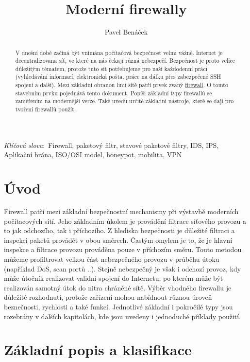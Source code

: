 \documentclass[11pt,a4paper]{article}
\title{Moderní firewally}
\author{Pavel Benáček}
\def\keywords{\vspace{.5em}
{\textit{Klíčová slova}:\,\relax%
}}
\begin{document}
\maketitle

\begin{abstract}
V dnešní době začíná být vnímána počítačová bezpečnost velmi vážně. Internet je decentralizovana síť, ve které na nás čekají různá nebezpečí. Bezpečnost je proto velice důležitým tématem, protože tuto síť potřebujeme pro naší každodenní práci (vyhledávání informací, elektronická pošta, práce na dálku přes zabezpečené SSH spojení a další). Mezi základní obranou linii sítě patří prvek zvaný \underline{firewall}. O tomto stavebním prvku pojednává tento dokument. Popíši základní typy firewallů se zaměřením na modernější verze. Také uvedu určité základní nástroje, které se dají pro tvoření firewallů použít.
\end{abstract}

\keywords{Firewall, paketový filtr, stavové paketové filtry, IDS, IPS, Aplikační brána, ISO/OSI model, honeypot, mobilita, VPN}

\tableofcontents

\section{Úvod}

Firewall patří mezi základní bezpečnostní mechanismy při výstavbě moderních počítacových sítí. Jeho základním úkolem je provádění filtrace síťového provozu a to jak odchozího, tak i příchozího. Z hlediska bezpečnosti je důležité filtraci a inspekci paketů provádět v obou směrech. Častým omylem je to, že je hlavní inspekce a filtrace provozu prováděna pouze v příchozím směru. Touto metodou můžeme profiltrovat velkou část nebezpečného provozu v průběhu útoku (například DoS, scan portů ..). Stejně nebezpečný je však i odchozí provoz, kdy může útočník realizovat validní spojení do Internetu, po kterém může být realizován samotný útok do nitra chráněné sítě. Výběr vhodného firewallu je důležité rozhodnutí, protože zařízení mohou nabídnout různou úroveň beznečnosti, rychlosti a také funkcí. Jednotlivé základní i pokročilé typy jsou rozebrány v dalších kapitolách, kde jsou uvedeny i jednoduché příklady použití.
 
\section{Základní popis a klasifikace} 
\end{document}
